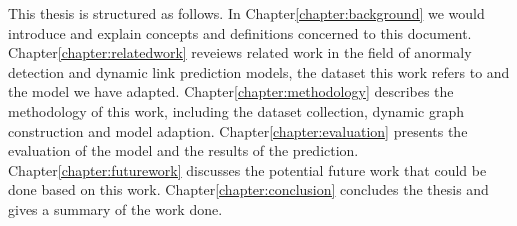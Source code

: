 This thesis is structured as follows. In Chapter\ref{chapter:background} we would introduce and explain concepts and definitions concerned to this document. Chapter\ref{chapter:relatedwork} reveiews related work in the field of anormaly detection and dynamic link prediction models, the dataset this work refers to and the model we have adapted. Chapter\ref{chapter:methodology} describes the methodology of this work, including the dataset collection, dynamic graph construction and model adaption. Chapter\ref{chapter:evaluation} presents the evaluation of the model and the results of the prediction. Chapter\ref{chapter:futurework} discusses the potential future work that could be done based on this work. Chapter\ref{chapter:conclusion} concludes the thesis and gives a summary of the work done.





